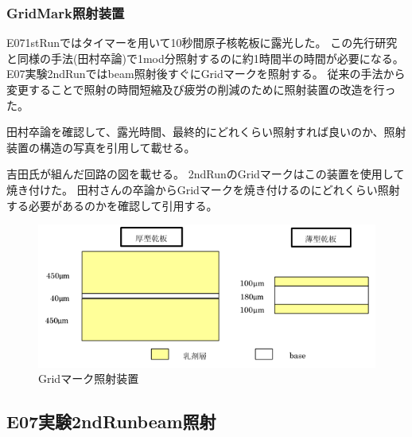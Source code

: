 \documentclass[12pt,a4paper]{jarticle}
\begin{document}
\subsubsection{GridMark照射装置}
E071stRunではタイマーを用いて10秒間原子核乾板に露光した。
この先行研究と同様の手法(田村卒論)で1mod分照射するのに約1時間半の時間が必要になる。
E07実験2ndRunではbeam照射後すぐにGridマークを照射する。
従来の手法から変更することで照射の時間短縮及び疲労の削減のために照射装置の改造を行った。
\par
田村卒論を確認して、露光時間、最終的にどれくらい照射すれば良いのか、照射装置の構造の写真を引用して載せる。
\par
吉田氏が組んだ回路の図を載せる。
2ndRunのGridマークはこの装置を使用して焼き付けた。
田村さんの卒論からGridマークを焼き付けるのにどれくらい照射する必要があるのかを確認して引用する。
\begin{figure}[htbp]
  \centering
     \includegraphics[width=140mm]{emulsionorder.png}
  \caption{Gridマーク照射装置\label{fig:grid_masi-nn}}
\end{figure}
\subsection{E07実験2ndRunbeam照射}
\end{document}
